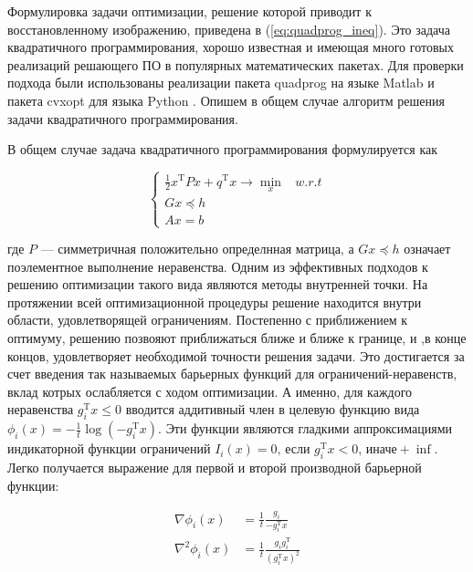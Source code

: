 Формулировка задачи оптимизации, решение которой приводит к восстановленному изображению, приведена в (\ref{eq:quadprog_ineq}).
Это задача квадратичного программирования, хорошо известная и имеющая много готовых реализаций решающего ПО в популярных математических пакетах.
Для проверки подхода были использованы реализации пакета quadprog на языке Matlab \cite{coleman1996reflective} и пакета cvxopt для языка Python \cite{andersen2013cvxopt}.
Опишем в общем случае алгоритм решения задачи квадратичного программирования.

В общем случае задача квадратичного программирования формулируется как 

\begin{equation}
  \label{eq:quadprog_general}
  \begin{cases}
  \frac 1 2 x^\mathrm{T}Px + q^\mathrm{T}x \rightarrow \min\limits_x & w.r.t \\
  Gx \preceq h \\
  Ax = b\,
  \end{cases}
\end{equation}

где $P$ --- симметричная положительно определнная матрица, а $Gx \preceq h$ означает поэлементное выполнение неравенства.
Одним из эффективных подходов к решению оптимизации такого вида являются методы внутренней точки.
На протяжении всей оптимизационной процедуры решение находится внутри области, удовлетворящей ограничениям.
Постепенно с приближением к оптимуму, решению позвояют приближаться ближе и ближе к границе, и ,в конце концов, удовлетворяет необходимой точности решения задачи.
Это достигается за счет введения так называемых барьерных функций для ограничений-неравенств, вклад котрых ослабляется с ходом оптимизации.
А именно, для каждого неравенства $g_i^\mathrm{T}x \leq 0$ вводится аддитивный член в целевую функцию вида $\phi_i(x) = -\frac 1 t \log{\left(- g_i^\mathrm{T}x \right)}$.
Эти функции являются гладкими аппроксимациями индикаторной функции ограничений $I_i(x) = 0 \text{, если } g_i^\mathrm{T}x < 0 \text{, иначе} +\inf$.
Легко получается выражение для первой и второй производной барьерной функции:

\begin{equation} 
\label{eq:barrier_grads}
\begin{split}
\nabla \phi_i(x) &= \frac 1 t \frac {g_i}{-g_i^\mathrm{T}x} \\
\nabla^2 \phi_i(x) &= \frac 1 t \frac {g_i g_i^\mathrm{T}} {\left( g_i^\mathrm{T}x \right)^2}
\end{split}
\end{equation}


